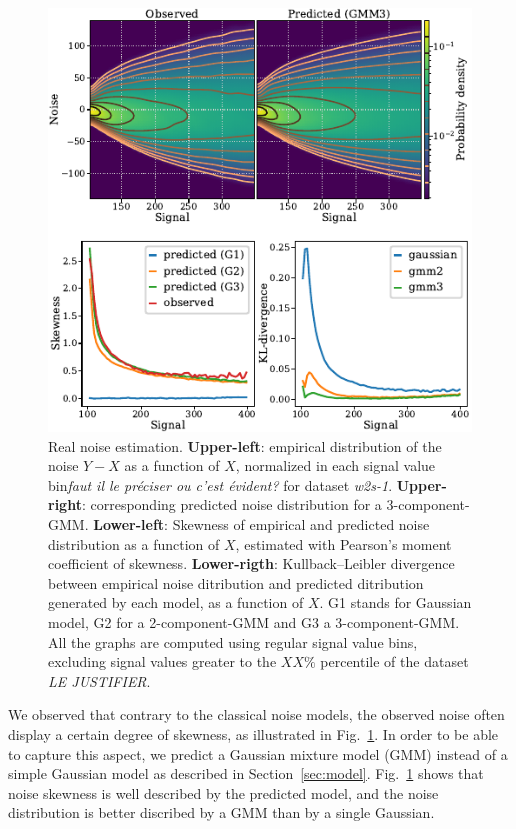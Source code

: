 \documentclass{article}
\begin{document}
\begin{figure}[ht]
\vskip 0.2in
\begin{center}
\centerline{\includegraphics[width=\columnwidth]{fig_skewness.pdf}}
\caption{Real noise estimation. \textbf{Upper-left}: empirical distribution of the noise $Y - X$ as a function of $X$, normalized in each signal value bin\textit{faut il le préciser ou c'est évident?} for dataset \textit{w2s-1}.
\textbf{Upper-right}: corresponding predicted noise distribution for a 3-component-GMM.
\textbf{Lower-left}: Skewness of empirical and predicted noise distribution as a function of $X$, estimated with Pearson's moment coefficient of skewness.
\textbf{Lower-rigth}:  Kullback–Leibler divergence between empirical noise ditribution and predicted ditribution generated by each model, as a function of $X$.
G1 stands for Gaussian model, G2 for a 2-component-GMM and G3 a 3-component-GMM.
All the graphs are computed using regular signal value bins, excluding signal values greater to the $XX\%$ percentile of the dataset \textit{LE JUSTIFIER}.}
\label{fig:skewness}
\end{center}
\vskip -0.2in
\end{figure}
We observed that contrary to the classical noise models, the observed noise often display a certain degree of skewness, as illustrated in Fig.~\ref{fig:skewness}.
In order to be able to capture this aspect, we predict a Gaussian mixture model (GMM) instead of a simple Gaussian model as described in Section~\ref{sec:model}. Fig.~\ref{fig:skewness} shows that noise skewness is well described by the predicted model, and the noise distribution is better discribed by a GMM than by a single Gaussian.
\end{document}
